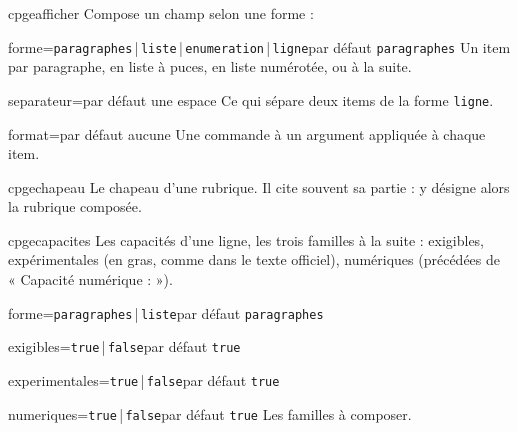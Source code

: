 \documentclass[a4paper,11pt]{article}
\begin{document}
\begin{docCommand}{cpgeafficher}{}
  Compose un champ selon une forme :
  \begin{docKey}{forme}{=\textcolor{blue!60!black}{\texttt{paragraphes}}\,|\,\texttt{liste}\,|\,\texttt{enumeration}\,|\,\texttt{ligne}}{par défaut \texttt{paragraphes}}
    Un item par paragraphe, en liste à puces, en liste numérotée, ou à la suite.
  \end{docKey}
  \begin{docKey}{separateur}{=}{par défaut une espace}
    Ce qui sépare deux items de la forme \texttt{ligne}.
  \end{docKey}
  \begin{docKey}{format}{=}{par défaut aucune}
    Une commande à un argument appliquée à chaque item.
  \end{docKey}
\end{docCommand}

\begin{dispExample}
\end{dispExample}

\begin{docCommand}{cpgechapeau}{}
  Le chapeau d'une rubrique. Il cite souvent sa partie : 
  y désigne alors la rubrique composée.
\end{docCommand}

\begin{dispExample}
\end{dispExample}

\begin{docCommand}{cpgecapacites}{}
  Les capacités d'une ligne, les trois familles à la suite : exigibles,
  expérimentales (en gras, comme dans le texte officiel), numériques (précédées
  de « Capacité numérique : »).
  \begin{docKey}{forme}{=\texttt{paragraphes}\,|\,\texttt{liste}}{par défaut \texttt{paragraphes}}\end{docKey}
  \begin{docKey}{exigibles}{=\texttt{true}\,|\,\texttt{false}}{par défaut \texttt{true}}\end{docKey}
  \begin{docKey}{experimentales}{=\texttt{true}\,|\,\texttt{false}}{par défaut \texttt{true}}\end{docKey}
  \begin{docKey}{numeriques}{=\texttt{true}\,|\,\texttt{false}}{par défaut \texttt{true}}
    Les familles à composer.
  \end{docKey}
\end{docCommand}
\end{document}
